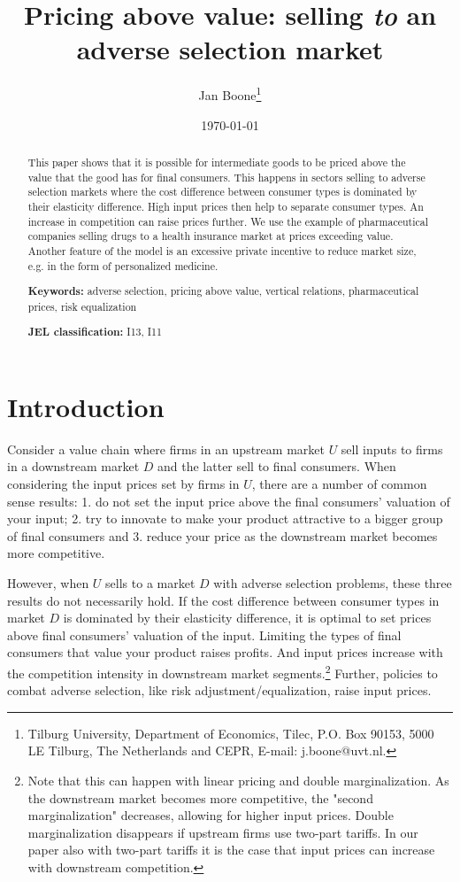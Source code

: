 \documentclass[12pt,english,a4paper]{article}
\author{Jan Boone\footnote{Tilburg University, Department of Economics, Tilec, P.O. Box 90153, 5000 LE Tilburg, The Netherlands and CEPR, E-mail: j.boone@uvt.nl.}}
\date{\today}
\title{Pricing above value: selling \emph{to} an adverse selection market}
\begin{document}
\maketitle
\begin{PREFACE}
\maketitle
\end{PREFACE}

\begin{abstract}
This paper shows that it is possible for intermediate goods to be priced above the value that the good has for final consumers. This happens in sectors selling to adverse selection markets where the cost difference between consumer types is dominated by their elasticity difference. High input prices then help to separate consumer types. An increase in competition can raise prices further. We use the example of pharmaceutical companies selling drugs to a health insurance market at prices exceeding value. Another feature of the model is an excessive private incentive to reduce market size, e.g. in the form of personalized medicine.

\textbf{Keywords:} adverse selection, pricing above value, vertical relations, pharmaceutical prices, risk equalization

\textbf{JEL classification:} I13, I11
\end{abstract}

\section{Introduction}
\label{sec:org70ccda2}

Consider a value chain where firms in an upstream market \(U\) sell inputs to firms in a downstream market \(D\) and the latter sell to final consumers. When considering the input prices set by firms in \(U\), there are a number of common sense results: 1. do not set the input price above the final consumers' valuation of your input; 2. try to innovate to make your product attractive to a bigger group of final consumers and 3. reduce your price as the downstream market becomes more competitive.

However, when \(U\) sells to a market \(D\) with adverse selection problems, these three results do not necessarily hold. If the cost difference between consumer types in market \(D\) is dominated by their elasticity difference, it is optimal to set prices above final consumers' valuation of the input. Limiting the types of final consumers that value your product raises profits. And input prices increase with the competition intensity in downstream market segments.\footnote{Note that this can happen with linear pricing and double marginalization. As the downstream market becomes more competitive, the "second marginalization" decreases, allowing for higher input prices. Double marginalization disappears if upstream firms use two-part tariffs. In our paper also with two-part tariffs it is the case that input prices can increase with downstream competition.} Further, policies to combat adverse selection, like risk adjustment/equalization, raise input prices.
\end{document}
